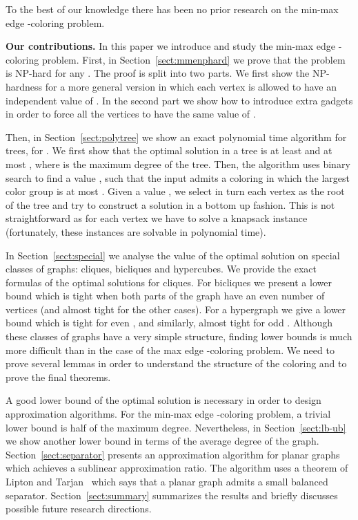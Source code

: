 \documentclass[runningheads, a4paper]{llncs}
\begin{document}
To the best of our knowledge there has been no prior research on the min-max edge -coloring problem.



\textbf{Our contributions.}
In this paper we introduce and study the min-max edge -coloring problem. First,  in Section~\ref{sect:mmenphard} we prove that the problem is NP-hard for any . The proof is split into two parts. We first show the NP-hardness for a more general version in which each vertex is allowed to have an independent value of . In the second part we show how to introduce extra gadgets in order to force all the vertices to have the same value of . 

Then, in Section~\ref{sect:polytree} we show an exact polynomial time algorithm for trees, for . We first show that the optimal solution in a tree is at least  and at most , where  is the maximum degree of the tree. Then, the algorithm uses binary search to find a value , such that the input admits a coloring in which the largest color group is at most . Given a value , we select in turn each vertex as the root of the tree and try to construct a solution in a bottom up fashion. This is not straightforward as for each vertex we have to solve a knapsack instance (fortunately, these instances are solvable in polynomial time).

In Section~\ref{sect:special} we analyse the value of the optimal solution on special classes of graphs: cliques, bicliques and hypercubes. We provide the exact formulas of the optimal solutions for cliques. For bicliques we present a lower bound which is tight when both parts of the graph have an even number of vertices (and almost tight for the other cases). For a hypergraph  we give a lower bound which is tight for even , and similarly, almost tight for odd . Although these classes of graphs have a very simple structure, finding lower bounds is much more difficult than in the case of the max edge -coloring problem. We need to prove several lemmas in order to understand the structure of the coloring and to prove the final theorems.

A good lower bound of the optimal solution is necessary in order to design approximation algorithms. For the min-max edge -coloring problem, a trivial lower bound is half of the maximum degree. Nevertheless, in Section~\ref{sect:lb-ub} we show another lower bound in terms of the average degree of the graph. Section~\ref{sect:separator}  presents an approximation algorithm for planar graphs which achieves a sublinear approximation ratio. The algorithm uses a theorem of Lipton and Tarjan~\cite{Lipton1980} which says that a planar graph admits a small balanced separator.
Section~\ref{sect:summary} summarizes the results and briefly discusses possible future research directions.
\end{document}
